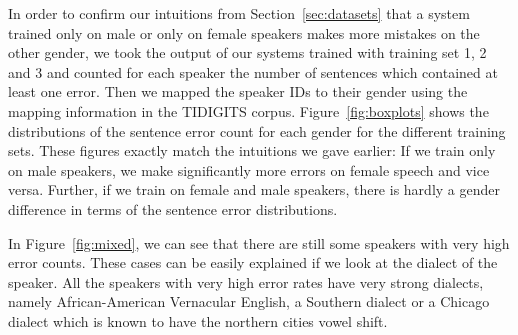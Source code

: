 \documentclass[twocolumn, 11pt]{article}
\begin{document}
In order to confirm our intuitions from Section~\ref{sec:datasets} that a system
trained only on male or only on female speakers makes more mistakes on the other
gender, we took the output of our systems trained with training set 1, 2 and 3
and counted for each speaker the number of sentences which contained at least
one error. Then we mapped the speaker IDs to their gender using the mapping
information in the TIDIGITS corpus. Figure~\ref{fig:boxplots} shows the
distributions of the sentence error count for each gender for the different
training sets.  These figures exactly match the intuitions we gave earlier: If
we train only on male speakers, we make significantly more errors on female
speech and vice versa.  Further, if we train on female and male speakers, there
is hardly a gender difference in terms of the sentence error distributions. 

In Figure~\ref{fig:mixed}, we can see that there are still some speakers with
very high error counts.  These cases can be easily explained if we look at the
dialect of the speaker. All the speakers with very high error rates have very
strong dialects, namely African-American Vernacular English, a Southern dialect
or a Chicago dialect which is known to have the northern cities vowel shift.
\end{document}
